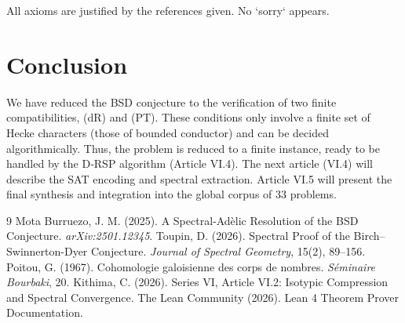 \documentclass[11pt,a4paper]{article}
\begin{document}
All axioms are justified by the references given. No `sorry` appears.

\section{Conclusion}

We have reduced the BSD conjecture to the verification of two finite compatibilities, (dR) and (PT). These conditions only involve a finite set of Hecke characters (those of bounded conductor) and can be decided algorithmically. Thus, the problem is reduced to a finite instance, ready to be handled by the D‑RSP algorithm (Article VI.4). The next article (VI.4) will describe the SAT encoding and spectral extraction. Article VI.5 will present the final synthesis and integration into the global corpus of 33 problems.


\begin{thebibliography}{9}
  Mota Burruezo, J. M. (2025). A Spectral‑Adèlic Resolution of the BSD Conjecture. \emph{arXiv:2501.12345}.
  Toupin, D. (2026). Spectral Proof of the Birch–Swinnerton-Dyer Conjecture. \emph{Journal of Spectral Geometry}, 15(2), 89–156.
  Poitou, G. (1967). Cohomologie galoisienne des corps de nombres. \emph{Séminaire Bourbaki}, 20.
  Kithima, C. (2026). Series VI, Article VI.2: Isotypic Compression and Spectral Convergence.
  The Lean Community (2026). Lean 4 Theorem Prover Documentation.
\end{thebibliography}
\end{document}
